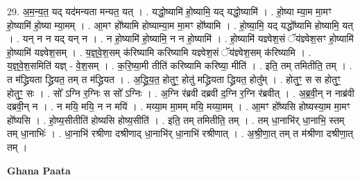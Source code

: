 \documentclass[17pt]{extarticle}
\begin{document}
29. अ॒म॒न्य॒त॒ यद् यद॑मन्यता मन्यत॒ यत् । . यद्धो॒ष्यामि॑ हो॒ष्यामि॒ यद् यद्धो॒ष्यामि॑ । . हो॒ष्या म्या॒म मा॒मꣳ हो॒ष्यामि॑ हो॒ष्या म्या॒मम् । . आ॒मꣳ हो᳚ष्यामि होष्याम्या॒म मा॒मꣳ हो᳚ष्यामि । . हो॒ष्या॒मि॒ यद् यद्धो᳚ष्यामि होष्यामि॒ यत् । . यन् न न यद् यन् न । . न हो॒ष्यामि॑ हो॒ष्यामि॒ न न हो॒ष्यामि॑ । . हो॒ष्यामि॑ यज्ञ्वेश॒सं ॅय॑ज्ञ्वेश॒सꣳ हो॒ष्यामि॑ हो॒ष्यामि॑ यज्ञ्वेश॒सम् । . य॒ज्ञ्॒वे॒श॒सम् क॑रिष्यामि करिष्यामि यज्ञ्वेश॒सं ॅय॑ज्ञ्वेश॒सम् क॑रिष्यामि । . य॒ज्ञ्॒वे॒श॒समिति॑ यज्ञ् - वे॒श॒सम् । . क॒रि॒ष्या॒मी तीति॑ करिष्यामि करिष्या॒ मीति॑ । . इति॒ तम् तमितीति॒ तम् । . त म॑द्ध्रियता द्ध्रियत॒ तम् त म॑द्ध्रियत । . अ॒द्ध्रि॒य॒त॒ होतुꣳ॒॒ होतु॑ मद्ध्रियता द्ध्रियत॒ होतु᳚म् । . होतुꣳ॒॒ स स होतुꣳ॒॒ होतुꣳ॒॒ सः । . सो᳚ ऽग्नि र॒ग्निः स सो᳚ ऽग्निः । . अ॒ग्नि र॑ब्रवी दब्रवी द॒ग्नि र॒ग्नि र॑ब्रवीत् । . अ॒ब्र॒वी॒न् न नाब्र॑वी दब्रवी॒न् न । . न मयि॒ मयि॒ न न मयि॑ । . मय्या॒म मा॒मम् मयि॒ मय्या॒मम् । . आ॒मꣳ हो᳚ष्यसि होष्यस्या॒म मा॒मꣳ हो᳚ष्यसि । . हो॒ष्य॒सीतीति॑ होष्यसि होष्य॒सीति॑ । . इति॒ तम् तमितीति॒ तम् । . तम् धा॒नाभि॑र् धा॒नाभि॒ स्तम् तम् धा॒नाभिः॑ । . धा॒नाभि॑ रश्रीणा दश्रीणाद् धा॒नाभि॑र् धा॒नाभि॑ रश्रीणात् । . अ॒श्री॒णा॒त् तम् त म॑श्रीणा दश्रीणा॒त् तम् । \newline

\textbf{Ghana Paata } \newline
\end{document}
